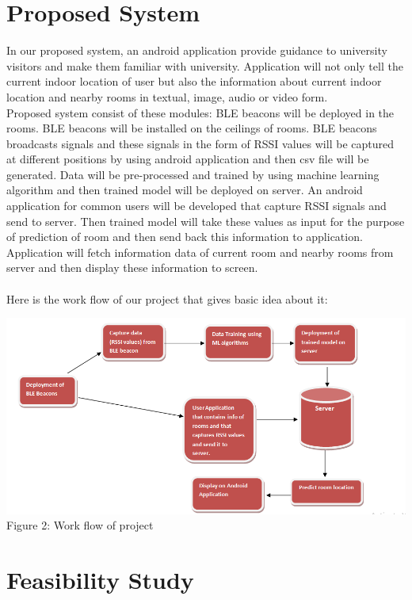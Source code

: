 \documentclass{article}
\begin{document}
\section{Proposed System}
In our proposed system, an android application provide guidance to university visitors and make them familiar with university. Application will not only tell the current indoor location of user but also the information about current indoor location and nearby rooms in textual, image, audio or video form.
\\
Proposed system consist of these modules:
BLE beacons will be deployed in the rooms. BLE beacons will be installed on the ceilings of rooms.
BLE beacons broadcasts signals and these signals in the form of RSSI values will be captured at different positions by using android application and then csv file will be generated.
Data will be pre-processed and trained by using machine learning algorithm and then trained model will be deployed on server.
An android application for common users will be developed that capture RSSI signals and send to server. Then trained model will take these values as input for the purpose of prediction of room and then send back this information to application.
Application will fetch information data of current room and nearby rooms from server and then display these information to screen.
\\
\\
Here is the work flow of our project that gives basic idea about it:
\begin{center}
\includegraphics[scale=0.7]{diagram}
\\Figure 2: Work flow of project 
\end{center}

\section{Feasibility Study}
\end{document}
